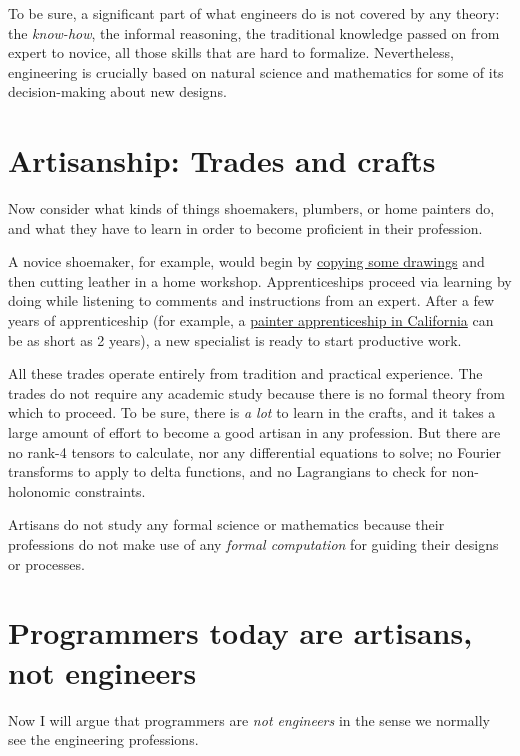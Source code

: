 To be sure, a significant part of what engineers do is not covered
by any theory: the \emph{know-how}, the informal reasoning, the traditional
knowledge passed on from expert to novice,  \textendash{}  all those
skills that are hard to formalize. Nevertheless, engineering is crucially
based on natural science and mathematics for some of its decision-making
about new designs.

\section{Artisanship: Trades and crafts }

Now consider what kinds of things shoemakers, plumbers, or home painters
do, and what they have to learn in order to become proficient in their
profession.

A novice shoemaker, for example, would begin by \href{https://youtu.be/cY5MY0czMAk\%3Ft\%3D141}{copying some drawings}
and then cutting leather in a home workshop. Apprenticeships proceed
via learning by doing while listening to comments and instructions
from an expert. After a few years of apprenticeship (for example,
a \href{http://www.calapprenticeship.org/programs/painter_apprenticeship.php}{painter apprenticeship in California}
can be as short as 2 years), a new specialist is ready to start productive
work. 

All these trades operate entirely from tradition and practical experience.
The trades do not require any academic study because there is no formal
theory from which to proceed. To be sure, there is \emph{a lot} to
learn in the crafts, and it takes a large amount of effort to become
a good artisan in any profession. But there are no rank-4 tensors
to calculate, nor any differential equations to solve; no Fourier
transforms to apply to delta functions, and no Lagrangians to check
for non-holonomic constraints.

Artisans do not study any formal science or mathematics because their
professions do not make use of any \emph{formal computation} for guiding
their designs or processes.

\section{Programmers today are artisans, not engineers }

Now I will argue that programmers are \emph{not engineers} in the
sense we normally see the engineering professions.

